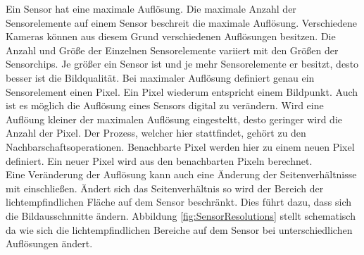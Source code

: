 
Ein Sensor hat eine maximale Auflösung. Die maximale Anzahl der Sensorelemente auf einem Sensor beschreit die maximale Auflösung. Verschiedene Kameras können aus diesem Grund verschiedenen Auflösungen besitzen. Die Anzahl und Größe der Einzelnen Sensorelemente variiert mit den Größen der Sensorchips. Je größer ein Sensor ist und je mehr Sensorelemente er besitzt, desto besser ist die Bildqualität\cite{Photonik}. Bei maximaler Auflösung definiert genau ein Sensorelement einen Pixel. Ein Pixel wiederum entspricht einem Bildpunkt\cite{Photonik}. Auch ist es möglich die Auflösung eines Sensors digital zu verändern. Wird eine Auflöung kleiner der maximalen Auflösung eingesteltt, desto geringer wird die Anzahl der Pixel. Der Prozess, welcher hier stattfindet, gehört zu den Nachbarschaftsoperationen. Benachbarte Pixel werden hier zu einem neuen Pixel definiert\cite{Photonik}. Ein neuer Pixel wird aus den benachbarten Pixeln berechnet.\\

%

%
%
%


Eine Veränderung der Auflösung kann auch eine Änderung der Seitenverhältnisse mit einschließen. Ändert sich das Seitenverhältnis so wird der Bereich der lichtempfindlichen Fläche auf dem Sensor beschränkt\cite{Photonik}. Dies führt dazu, dass sich die Bildausschnnitte ändern. Abbildung \ref{fig:SensorResolutions} stellt schematisch da wie sich die lichtempfindlichen Bereiche auf dem Sensor bei unterschiedlichen Auflösungen ändert.


